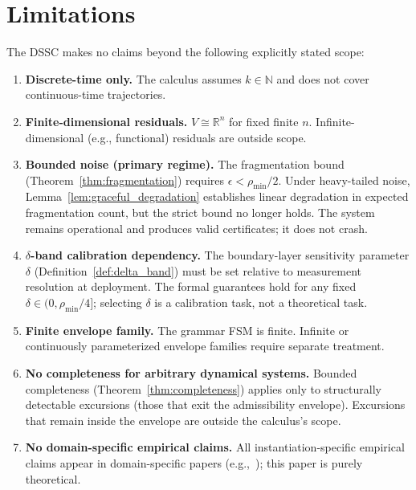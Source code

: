 \documentclass[11pt,a4paper]{article}
\theoremstyle{plain}
\theoremstyle{definition}
\theoremstyle{remark}
\newcommand{\R}{\mathbb{R}}
\newcommand{\N}{\mathbb{N}}
\begin{document}
\section{Limitations}
\label{sec:limitations}

The DSSC makes no claims beyond the following explicitly stated scope:
\begin{enumerate}[nosep]
  \item \textbf{Discrete-time only.} The calculus assumes $k \in \N$ and does not cover
    continuous-time trajectories.
  \item \textbf{Finite-dimensional residuals.} $V \cong \R^n$ for fixed finite $n$. Infinite-
    dimensional (e.g., functional) residuals are outside scope.
  \item \textbf{Bounded noise (primary regime).} The fragmentation bound (Theorem~\ref{thm:fragmentation})
    requires $\epsilon < \rho_{\min}/2$. Under heavy-tailed noise, Lemma~\ref{lem:graceful_degradation}
    establishes linear degradation in expected fragmentation count, but the strict bound no longer
    holds. The system remains operational and produces valid certificates; it does not crash.
  \item \textbf{$\delta$-band calibration dependency.} The boundary-layer sensitivity parameter
    $\delta$ (Definition~\ref{def:delta_band}) must be set relative to measurement resolution
    at deployment. The formal guarantees hold for any fixed $\delta \in (0, \rho_{\min}/4]$;
    selecting $\delta$ is a calibration task, not a theoretical task.
  \item \textbf{Finite envelope family.} The grammar FSM is finite. Infinite or continuously
    parameterized envelope families require separate treatment.
  \item \textbf{No completeness for arbitrary dynamical systems.} Bounded completeness
    (Theorem~\ref{thm:completeness}) applies only to structurally detectable excursions (those
    that exit the admissibility envelope). Excursions that remain inside the envelope are
    outside the calculus's scope.
  \item \textbf{No domain-specific empirical claims.} All instantiation-specific empirical
    claims appear in domain-specific papers (e.g.,~\cite{dsfb_semi,dsfb_battery}); this paper
    is purely theoretical.
\end{enumerate}
\end{document}
